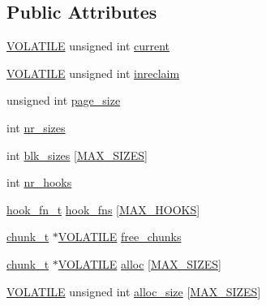 \subsection*{Public Attributes}
\begin{DoxyCompactItemize}
\item 
\hyperlink{intel__defns_8h_ad11a425b3e3a32fcc63fb4296c23dcc4}{V\-O\-L\-A\-T\-I\-L\-E} unsigned int \hyperlink{structgc__global__st_ae4b23512b173dbd7f9125411b4d8c000}{current}
\item 
\hyperlink{intel__defns_8h_ad11a425b3e3a32fcc63fb4296c23dcc4}{V\-O\-L\-A\-T\-I\-L\-E} unsigned int \hyperlink{structgc__global__st_a9044611cc3b403f207e74d73f464ec93}{inreclaim}
\item 
unsigned int \hyperlink{structgc__global__st_ad2d5c64649acda3f422f0fb547553b9c}{page\-\_\-size}
\item 
int \hyperlink{structgc__global__st_a231105576ce326a28950acdea59f6323}{nr\-\_\-sizes}
\item 
int \hyperlink{structgc__global__st_a40ce20b4e8d128f13d48eead9852acc3}{blk\-\_\-sizes} \mbox{[}\hyperlink{gc_8c_ab0e65719548729791281faee6068905b}{M\-A\-X\-\_\-\-S\-I\-Z\-E\-S}\mbox{]}
\item 
int \hyperlink{structgc__global__st_ab9ccff745ba6c01e569dd2647ad2e1f6}{nr\-\_\-hooks}
\item 
\hyperlink{gc_8h_a42f21fddc282b094c8d8a9010ac22fa4}{hook\-\_\-fn\-\_\-t} \hyperlink{structgc__global__st_aa34a4cc9b5e2983799bc6218cfb3d7d4}{hook\-\_\-fns} \mbox{[}\hyperlink{gc_8c_a95b6a1ec44c296be366d09c891676556}{M\-A\-X\-\_\-\-H\-O\-O\-K\-S}\mbox{]}
\item 
\hyperlink{gc_8c_a86d0de2b8550a1f7156c949ace00bba1}{chunk\-\_\-t} $\ast$\hyperlink{intel__defns_8h_ad11a425b3e3a32fcc63fb4296c23dcc4}{V\-O\-L\-A\-T\-I\-L\-E} \hyperlink{structgc__global__st_a50fbc7d9a02264519494c48b98469897}{free\-\_\-chunks}
\item 
\hyperlink{gc_8c_a86d0de2b8550a1f7156c949ace00bba1}{chunk\-\_\-t} $\ast$\hyperlink{intel__defns_8h_ad11a425b3e3a32fcc63fb4296c23dcc4}{V\-O\-L\-A\-T\-I\-L\-E} \hyperlink{structgc__global__st_a23a72ec39eb29dea618d708c334895ec}{alloc} \mbox{[}\hyperlink{gc_8c_ab0e65719548729791281faee6068905b}{M\-A\-X\-\_\-\-S\-I\-Z\-E\-S}\mbox{]}
\item 
\hyperlink{intel__defns_8h_ad11a425b3e3a32fcc63fb4296c23dcc4}{V\-O\-L\-A\-T\-I\-L\-E} unsigned int \hyperlink{structgc__global__st_ae4f52ed77679e03df34c54304c4ea691}{alloc\-\_\-size} \mbox{[}\hyperlink{gc_8c_ab0e65719548729791281faee6068905b}{M\-A\-X\-\_\-\-S\-I\-Z\-E\-S}\mbox{]}
\end{DoxyCompactItemize}


